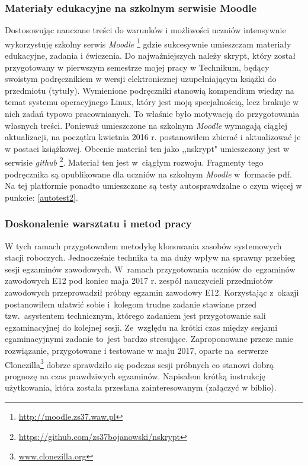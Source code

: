 \documentclass[a4paper,titlepage,13pt,draft]{mwart}
\begin{document}
\begin{flushleft}
\subsubsection{Materiały edukacyjne na szkolnym serwisie Moodle}\newline
Dostosowując nauczane treści do warunków i możliwości uczniów intensywnie wykorzystuję szkolny serwis \textit{Moodle} \footnote{\url{http://moodle.zs37.waw.pl}} gdzie sukcesywnie umieszczam materiały edukacyjne, zadania i ćwiczenia.\newline 
Do najważniejszych należy skrypt, który został przygotowany w pierwszym semestrze mojej pracy w Technikum, będący swoistym podręcznikiem w wersji elektronicznej uzupełniającym książki do przedmiotu (tytuły). Wymienione podręczniki stanowią kompendium wiedzy na temat systemu operacyjnego Linux, który jest moją specjalnością, lecz brakuje w nich zadań typowo pracownianych. To właśnie było motywacją do przygotowania własnych treści.\newline
Ponieważ umieszczone na szkolnym \textit{Moodle} wymagają ciągłej aktualizacji, na początku kwietnia 2016 r. postanowiłem zbierać i aktualizować je w postaci książkowej. Obecnie materiał ten jako ,,nskrypt" umieszczony jest w serwisie \textit{github} \footnote{\url{https://github.com/zs37bojanowski/nskrypt}}. Materiał ten jest w~ciągłym rozwoju. Fragmenty tego podręcznika są opublikowane dla uczniów na szkolnym \textit{Moodle} w~formacie pdf.
Na tej platformie ponadto umieszczane są testy autosprawdzalne o czym więcej w punkcie: \ref{autotest2}.
\subsubsection{Doskonalenie warsztatu i metod pracy}\newline
W tych ramach przygotowałem metodykę klonowania zasobów systemowych stacji roboczych. Jednocześnie technika ta ma duży wpływ na sprawny przebieg sesji egzaminów zawodowych. W~ramach przygotowania uczniów do~egzaminów zawodowych E12 pod koniec maja 2017 r. zespół nauczycieli przedmiotów zawodowych przeprowadził próbny egzamin zawodowy E12. Korzystając z~okazji postanowiłem ułatwić sobie i~kolegom trudne zadanie stawiane przed tzw.~asystentem technicznym, którego zadaniem jest przygotowanie sali egzaminacyjnej do kolejnej sesji. Ze~względu na krótki czas między sesjami egaminacyjnymi zadanie to~jest bardzo stresujące. Zaproponowane przeze mnie rozwiązanie, przygotowane i testowane w maju 2017, oparte na~serwerze Clonezilla\footnote{\url{www.clonezilla.org}} dobrze sprawdziło się podczas sesji próbnych co stanowi dobrą prognozę na czas prawdziwych egzaminów. Napisałem krótką instrukcję użytkowania, która została przesłana zainteresowanym (załączyć w biblio).

\end{flushleft}
\end{document}
